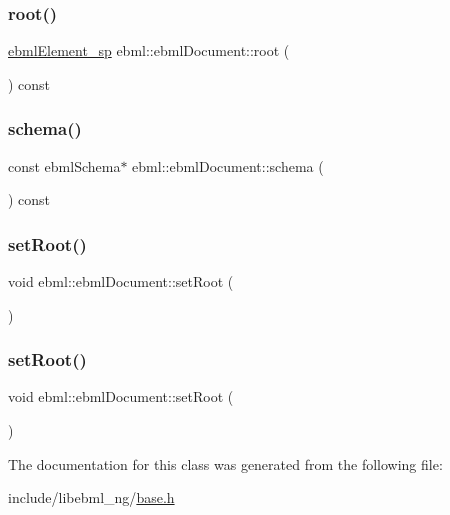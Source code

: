 \subsubsection{\texorpdfstring{root()}{root()}}
{\footnotesize\ttfamily \mbox{\hyperlink{namespaceebml_adad533b7705a16bb360fe56380c5e7be}{ebml\+Element\+\_\+sp}} ebml\+::ebml\+Document\+::root (\begin{DoxyParamCaption}{ }\end{DoxyParamCaption}) const}

\mbox{\label{classebml_1_1ebmlDocument_aff3d1abece0a2bedf5a90e6af0ff3ddd}} 
\subsubsection{\texorpdfstring{schema()}{schema()}}
{\footnotesize\ttfamily const ebml\+Schema$\ast$ ebml\+::ebml\+Document\+::schema (\begin{DoxyParamCaption}{ }\end{DoxyParamCaption}) const}

\mbox{\label{classebml_1_1ebmlDocument_a387ed69ab3730a9e0f30ac4cd8ab0a8e}} 
\subsubsection{\texorpdfstring{set\+Root()}{setRoot()}\hspace{0.1cm}{\footnotesize\ttfamily [1/2]}}
{\footnotesize\ttfamily void ebml\+::ebml\+Document\+::set\+Root (\begin{DoxyParamCaption}\item[{\mbox{\hyperlink{namespaceebml_adad533b7705a16bb360fe56380c5e7be}{ebml\+Element\+\_\+sp}}}]{ }\end{DoxyParamCaption})}

\mbox{\label{classebml_1_1ebmlDocument_a4c63a8355ff1227d80c6cfc511ec1bb6}} 
\subsubsection{\texorpdfstring{set\+Root()}{setRoot()}\hspace{0.1cm}{\footnotesize\ttfamily [2/2]}}
{\footnotesize\ttfamily void ebml\+::ebml\+Document\+::set\+Root (\begin{DoxyParamCaption}\item[{\mbox{\hyperlink{classebml_1_1ebmlElement}{ebml\+Element}} $\ast$}]{ }\end{DoxyParamCaption})}



The documentation for this class was generated from the following file\+:\begin{DoxyCompactItemize}
\item 
include/libebml\+\_\+ng/\mbox{\hyperlink{base_8h}{base.\+h}}\end{DoxyCompactItemize}
